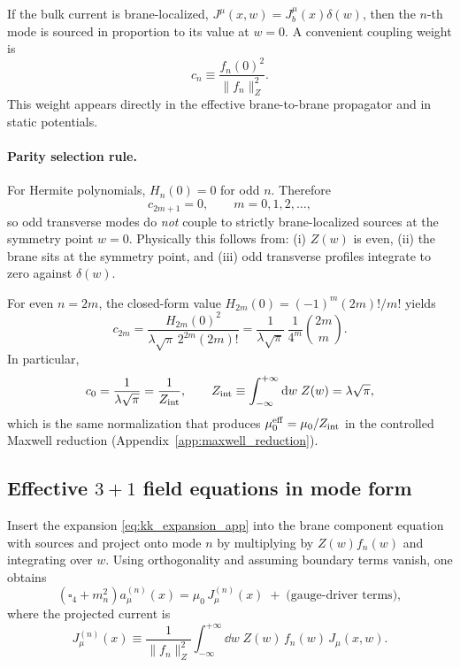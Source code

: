 \documentclass[11pt]{article}
\newcommand{\Z}{Z}              %
\newcommand{\Zint}{Z_{\rm int}}
\begin{document}
If the bulk current is brane-localized, \(J^\mu(x,w)=J_b^\mu(x)\delta(w)\), then the
\(n\)-th mode is sourced in proportion to its value at \(w=0\). A convenient coupling
weight is
\begin{equation}
c_n \equiv \frac{f_n(0)^2}{\|f_n\|_{\Z}^2}.
\label{eq:cn_def_app}
\end{equation}
This weight appears directly in the effective brane-to-brane propagator and in static
potentials.

\paragraph{Parity selection rule.}
For Hermite polynomials, \(H_n(0)=0\) for odd \(n\). Therefore
\begin{equation}
c_{2m+1}=0,
\qquad m=0,1,2,\ldots,
\label{eq:odd_modes_decouple_app}
\end{equation}
so odd transverse modes do \emph{not} couple to strictly brane-localized sources at
the symmetry point \(w=0\). Physically this follows from:
(i) \(\Z(w)\) is even,
(ii) the brane sits at the symmetry point, and
(iii) odd transverse profiles integrate to zero against \(\delta(w)\).

For even \(n=2m\), the closed-form value \(H_{2m}(0)=(-1)^m(2m)!/m!\) yields
\begin{equation}
c_{2m}
= \frac{H_{2m}(0)^2}{\lambda\sqrt{\pi}\,2^{2m}(2m)!}
= \frac{1}{\lambda\sqrt{\pi}}\,
\frac{1}{4^m}\binom{2m}{m}.
\label{eq:cn_even_app}
\end{equation}
In particular,
\begin{equation}
c_0=\frac{1}{\lambda\sqrt{\pi}}
=\frac{1}{\Zint},
\qquad
\Zint\equiv \int_{-\infty}^{+\infty}\dd w\;\Z(w)=\lambda\sqrt{\pi},
\label{eq:c0_and_Zint_app}
\end{equation}
which is the same normalization that produces \(\mu_0^{\rm eff}=\mu_0/\Zint\) in the
controlled Maxwell reduction (Appendix~\ref{app:maxwell_reduction}).

\subsection{Effective \texorpdfstring{$3+1$}{3+1} field equations in mode form}
\label{app:mode_field_equations}

Insert the expansion \eqref{eq:kk_expansion_app} into the brane component equation
with sources and project onto mode \(n\) by multiplying by \(\Z(w)f_n(w)\) and integrating
over \(w\). Using orthogonality and assuming boundary terms vanish, one obtains
\begin{equation}
\left(\square_4 + m_n^2\right)a_\mu^{(n)}(x)
=
\mu_0\,J_{\mu}^{(n)}(x)
\;+\;\text{(gauge-driver terms)},
\label{eq:mode_wave_equation_app}
\end{equation}
where the projected current is
\begin{equation}
J_{\mu}^{(n)}(x)\equiv
\frac{1}{\|f_n\|_{\Z}^2}
\int_{-\infty}^{+\infty}\dd w\;\Z(w)\,f_n(w)\,J_\mu(x,w).
\label{eq:mode_projected_current_app}
\end{equation}
\end{document}
